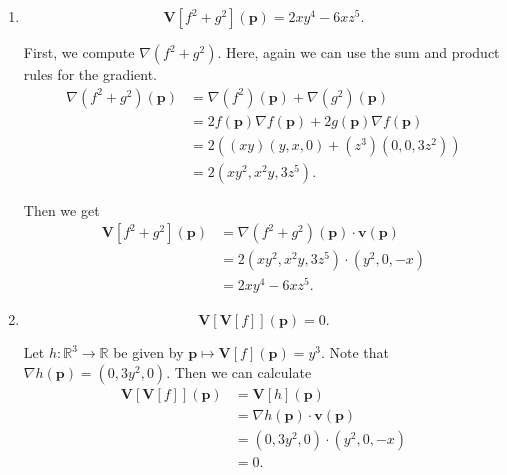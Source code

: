 \documentclass[12 pt, letterpaper]{hmcpset}
\begin{document}
\begin{solution}
\begin{enumerate}
			Here we can use our previous computations of $\mathbf V[f](\mathbf p)$ and $\mathbf V[g](\mathbf p)$ to get
			\[
				\begin{split}
					(f \mathbf V[g] + g \mathbf V[f])(\mathbf p) & = f(\mathbf p) \mathbf V[g](\mathbf p) + g(\mathbf p) \mathbf V[f](\mathbf p) \\
										     & = (xy)(-3xz^2) + (z^3)(y^3) \\
										     & = y^3 z^3 - 3 x^2 y z^2
				\end{split}
			\]
		\item
			\[
				\boxed{
					\mathbf V[f^2 + g^2](\mathbf p) = 2 x y^4 - 6 x z^5.
				}
			\] 

			First, we compute $\nabla (f^2 + g^2)$. Here, again we can use the sum and product rules for the gradient.
			\[
				\begin{split}
					\nabla(f^2 + g^2)(\mathbf p) & = \nabla(f^2)(\mathbf p) + \nabla(g^2)(\mathbf p) \\
								     & = 2 f(\mathbf p) \nabla f(\mathbf p) + 2 g(\mathbf p) \nabla f(\mathbf p) \\
								     & = 2 ((xy)(y, x, 0) + (z^3)(0, 0, 3z^2)) \\
								     & = 2 (x y^2, x^2 y, 3z^5).
				\end{split}
			\] 

			Then we get
			\[
				\begin{split}
					\mathbf V[f^2 + g^2](\mathbf p) & = \nabla(f^2 + g^2)(\mathbf p) \cdot \mathbf v(\mathbf p) \\
									& = 2 (x y^2, x^2 y, 3z^5) \cdot (y^2, 0, -x) \\
									& = 2 x y^4 - 6 x z^5.
				\end{split}
			\]
		\item
			\[
				\boxed{
					\mathbf V[\mathbf V[f]] (\mathbf p) = 0.
				}
			\] 

			Let $h : \mathbb R^3 \to \mathbb R$ be given by $\mathbf p \mapsto \mathbf V[f](\mathbf p) = y^3$. Note that $\nabla h(\mathbf p) = (0, 3y^2, 0)$. Then we can calculate
			\[
				\begin{split}
					\mathbf V[\mathbf V[f]](\mathbf p) & = \mathbf V[h](\mathbf p) \\
									   & = \nabla h(\mathbf p) \cdot \mathbf v(\mathbf p) \\
									   & = (0, 3y^2, 0) \cdot (y^2, 0, -x) \\
									   & = 0.
				\end{split}
			\]
	\end{enumerate}
\end{solution}
\end{document}
